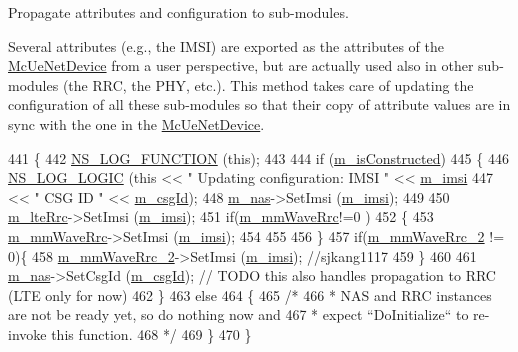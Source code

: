 Propagate attributes and configuration to sub-\/modules. 

Several attributes (e.\+g., the I\+M\+SI) are exported as the attributes of the \hyperlink{classns3_1_1McUeNetDevice}{Mc\+Ue\+Net\+Device} from a user perspective, but are actually used also in other sub-\/modules (the R\+RC, the P\+HY, etc.). This method takes care of updating the configuration of all these sub-\/modules so that their copy of attribute values are in sync with the one in the \hyperlink{classns3_1_1McUeNetDevice}{Mc\+Ue\+Net\+Device}. 
\begin{DoxyCode}
441 \{
442         \hyperlink{log-macros-disabled_8h_a90b90d5bad1f39cb1b64923ea94c0761}{NS\_LOG\_FUNCTION} (\textcolor{keyword}{this});
443 
444         \textcolor{keywordflow}{if} (\hyperlink{classns3_1_1McUeNetDevice_a279015f246fd2390546e86534c58af98}{m\_isConstructed})
445         \{
446                 \hyperlink{group__logging_ga88acd260151caf2db9c0fc84997f45ce}{NS\_LOG\_LOGIC} (\textcolor{keyword}{this} << \textcolor{stringliteral}{" Updating configuration: IMSI "} << 
      \hyperlink{classns3_1_1McUeNetDevice_ac441060b78843a6a01ddb10d68b1eee3}{m\_imsi}
447                              << \textcolor{stringliteral}{" CSG ID "} << \hyperlink{classns3_1_1McUeNetDevice_a5bdf8e15e3ec87d8910204d80fcbd116}{m\_csgId});
448                 \hyperlink{classns3_1_1McUeNetDevice_ad28cd170780f825a1d8b12beb814a511}{m\_nas}->SetImsi (\hyperlink{classns3_1_1McUeNetDevice_ac441060b78843a6a01ddb10d68b1eee3}{m\_imsi});
449 
450                 \hyperlink{classns3_1_1McUeNetDevice_aac81a393e1f9101f016915c957e91d97}{m\_lteRrc}->SetImsi (\hyperlink{classns3_1_1McUeNetDevice_ac441060b78843a6a01ddb10d68b1eee3}{m\_imsi});
451     \textcolor{keywordflow}{if}(\hyperlink{classns3_1_1McUeNetDevice_aee9cd8974389dbb0260b3c274cd55f82}{m\_mmWaveRrc}!=0 )
452     \{
453       \hyperlink{classns3_1_1McUeNetDevice_aee9cd8974389dbb0260b3c274cd55f82}{m\_mmWaveRrc}->SetImsi (\hyperlink{classns3_1_1McUeNetDevice_ac441060b78843a6a01ddb10d68b1eee3}{m\_imsi});
454 
455 
456     \}
457     \textcolor{keywordflow}{if}(\hyperlink{classns3_1_1McUeNetDevice_a47adcb400e9cdf80e1618a5e693ee2ee}{m\_mmWaveRrc\_2} != 0)\{
458         \hyperlink{classns3_1_1McUeNetDevice_a47adcb400e9cdf80e1618a5e693ee2ee}{m\_mmWaveRrc\_2}->SetImsi (\hyperlink{classns3_1_1McUeNetDevice_ac441060b78843a6a01ddb10d68b1eee3}{m\_imsi}); \textcolor{comment}{//sjkang1117}
459     \}
460                 
461                 \hyperlink{classns3_1_1McUeNetDevice_ad28cd170780f825a1d8b12beb814a511}{m\_nas}->SetCsgId (\hyperlink{classns3_1_1McUeNetDevice_a5bdf8e15e3ec87d8910204d80fcbd116}{m\_csgId}); \textcolor{comment}{// TODO this also handles propagation to RRC (LTE
       only for now) }
462         \}
463         \textcolor{keywordflow}{else}
464         \{
465           \textcolor{comment}{/*}
466 \textcolor{comment}{           * NAS and RRC instances are not be ready yet, so do nothing now and}
467 \textcolor{comment}{           * expect ``DoInitialize`` to re-invoke this function.}
468 \textcolor{comment}{           */}
469         \}
470 \}
\end{DoxyCode}


